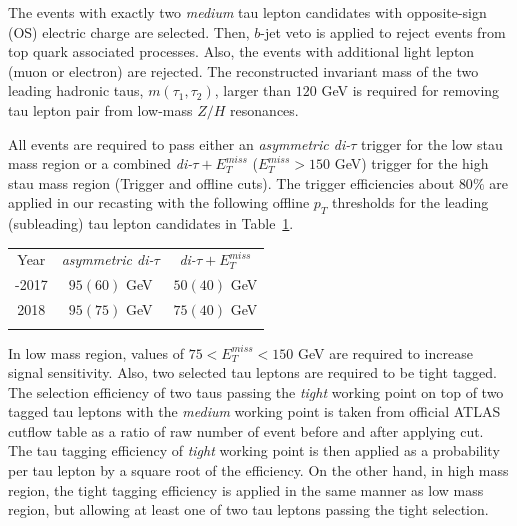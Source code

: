 \documentclass{ws-mpla}
\begin{document}

The events with exactly two \textit{medium} tau lepton candidates with opposite-sign (OS) electric charge are selected.
Then, $b$-jet veto is applied to reject events from top quark associated processes.
Also, the events with additional light lepton (muon or electron) are rejected.
The reconstructed invariant mass of the two leading {\color{blue}hadronic taus}, $m(\tau_1,\tau_2)$, larger than $120$ GeV is required for removing tau lepton pair from low-mass {\color{blue}$Z/H$ resonances}.

All events are required to pass either an \textit{asymmetric di-$\tau$} trigger for the low stau mass region or a combined \textit{di-$\tau +E^{miss}_T$} ($E^{miss}_T > 150$ GeV) trigger for the high stau mass region (Trigger and offline cuts).
The trigger efficiencies about $80\%$ are applied in our recasting with the following offline $p_T$ thresholds for the leading (subleading) tau lepton candidates in Table~\ref{tab:trig-eff}.

\begin{table}[h!]
  {\begin{tabular}{@{}c c c@{}} \toprule
  Year & \textit{asymmetric di-$\tau$} & \textit{di-$\tau +E^{miss}_T$} \\
  \colrule
 2015-2017 & $95(60)$ GeV & $50(40)$ GeV \\
 2018 & $95(75)$ GeV & $75(40)$ GeV \\ 
  \botrule
  \end{tabular}\label{tab:trig-eff} }
\end{table}

In {\color{blue}low mass} region, values of $75 < E^{miss}_T < 150$ GeV are required to increase signal sensitivity.
Also, two selected tau leptons are required to be tight tagged.
The selection efficiency of two taus passing the \textit{tight} working point on top of two {\color{blue}tagged tau leptons with the \textit{medium} working point is} taken from official ATLAS cutflow table as a ratio of raw number of event before and after applying cut. {\color{blue}The  tau tagging efficiency of \textit{tight} working point} is then applied as a probability per tau lepton by a square root of the efficiency.
On the other hand, in {\color{blue}high mass} region, the tight tagging efficiency is applied in the same manner as {\color{blue}low mass} region, but allowing at least one of two tau leptons passing the tight selection.
\end{document}
